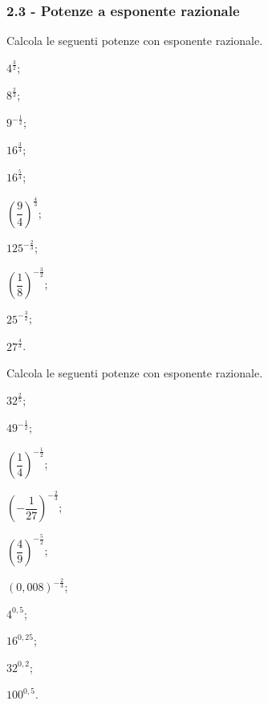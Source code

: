 \subsubsection*{2.3 - Potenze a esponente razionale}
\begin{esercizio}
 \label{ese:2.16}
Calcola le seguenti potenze con esponente razionale.
 \begin{multicols}{3}
 \begin{enumeratea}
 \item $4^{\frac 3 2}$;
 \item $8^{\frac 2 3}$;
 \item $9^{-\frac 1 2}$;
 \item $16^{\frac 3 4}$;
 \item $16^{\frac 5 4}$;
 \item $\left(\dfrac 9 4\right)^{\frac 4 3}$;
 \item $125^{-\frac 2 3}$;
 \item $\left(\dfrac 1 8\right)^{-\frac 3 2}$;
 \item $25^{-\frac 3 2}$;
 \item $27^{\frac 4 3}$.
 \end{enumeratea}
 \end{multicols}
\end{esercizio}

\begin{esercizio}[\Ast]
 \label{ese:2.17}
Calcola le seguenti potenze con esponente razionale.
 \begin{multicols}{3}
 \begin{enumeratea}
 \item $32^{\frac 2 5}$;
 \item $49^{-\frac 1 2}$;
 \item $\left(\dfrac 1 4\right)^{-\frac 1 2}$;
 \item $\left(-\dfrac 1{27}\right)^{-\frac 2 3}$;
 \item $\left(\dfrac 4 9\right)^{-\frac 5 2}$;
 \item $\left(0,008\right)^{-\frac 2 3}$;
 \item $4^{0,5}$;
 \item $16^{0,25}$;
 \item $32^{0,2}$;
 \item $100^{0,5}$.
 \end{enumeratea}
 \end{multicols}
\end{esercizio}

